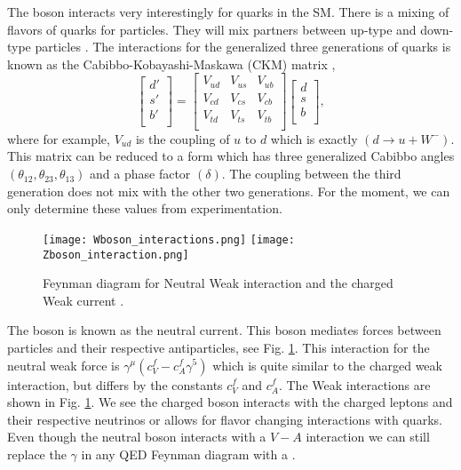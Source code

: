 The \W{} boson interacts very interestingly for quarks in the SM. There is a mixing of flavors of quarks for particles. They will mix partners between up-type and down-type particles \cite{kobayashi_cp-violation_1973}. The interactions for the generalized three generations of quarks is known as the Cabibbo-Kobayashi-Maskawa (CKM) matrix \cite{halzen_quarks_1984, griffiths_introduction_2008},
\begin{equation}\label{CKM}
\begin{bmatrix}
d' \\
s' \\
b' \\
\end{bmatrix} =
\begin{bmatrix}
V_{ud} & V_{us} & V_{ub} \\
V_{cd} & V_{cs} & V_{cb} \\
V_{td} & V_{ts} & V_{tb} \\
\end{bmatrix}
\begin{bmatrix}
d \\
s \\
b \\
\end{bmatrix},
\end{equation}
where for example, $V_{ud}$ is the coupling of $u$ to $d$ which is exactly $(d\rightarrow u+W^-)$. This matrix can be reduced to a form which has three generalized Cabibbo angles $(\theta_{12},\theta_{23},\theta_{13})$ and a phase factor $(\delta)$. The coupling between the third generation does not mix with the other two generations. For the moment, we can only determine these values from experimentation. 

\begin{figure}[!htb]
	  \texttt{[image: Wboson\_interactions.png]}
	\endminipage\hfill
	  \texttt{[image: Zboson\_interaction.png]}
	\endminipage\hfill
	\caption[Weak Feynman Diagrams]{Feynman diagram for Neutral Weak interaction and the charged Weak current \cite{griffiths_introduction_2008}.}
 	\label{WeakRules} 
\end{figure}

The \Z{} boson is known as the neutral current. This boson mediates forces between particles and their respective antiparticles, see Fig. \ref{WeakRules}. This interaction for the neutral weak force is $\gamma^\mu(c_V^f-c_A^f\gamma^5)$ which is quite similar to the charged weak interaction, but differs by the constants $c_V^f$ and $c_A^f$. The Weak interactions are shown in Fig. \ref{WeakRules}. We see the charged \W{} boson interacts with the charged leptons and their respective neutrinos or allows for flavor changing interactions with quarks. Even though the neutral \Z{} boson interacts with a $V-A$ interaction we can still replace the $\gamma$ in any QED Feynman diagram with a \Z{} \cite{halzen_quarks_1984, griffiths_introduction_2008}.

